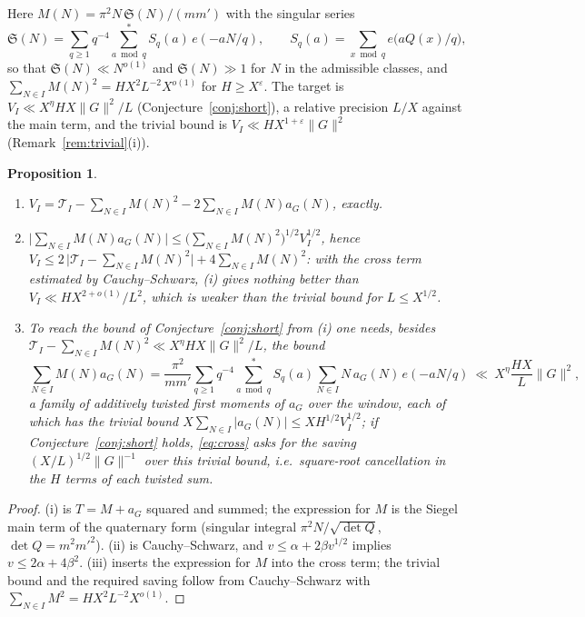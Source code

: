 \documentclass[11pt]{amsart}
\newtheorem{proposition}[theorem]{Proposition}
\theoremstyle{remark}
\newcommand{\e}{\varepsilon}
\begin{document}
Here $M(N)=\pi^2N\,\mathfrak S(N)/(mm')$ with the singular series
\[
\mathfrak S(N)=\sum_{q\ge1}q^{-4}\sum_{a\bmod q}^*S_q(a)\,e(-aN/q),\qquad S_q(a)=\sum_{x\bmod q}e\bigl(aQ(x)/q\bigr),
\]
so that $\mathfrak S(N)\ll N^{o(1)}$ and $\mathfrak S(N)\gg1$ for $N$ in the admissible classes, and $\sum_{N\in I}M(N)^2=HX^2L^{-2}X^{o(1)}$ for $H\ge X^\e$. The target is $V_I\ll X^\eta HX\|G\|^2/L$ (Conjecture~\ref{conj:short}), a relative precision $L/X$ against the main term, and the trivial bound is $V_I\ll HX^{1+\e}\|G\|^2$ (Remark~\ref{rem:trivial}(i)).

\begin{proposition}\label{prop:lattice}
\begin{enumerate}[label=\textup{(\roman*)},leftmargin=2.2em]
\item $V_I=\mathcal T_I-\sum_{N\in I}M(N)^2-2\sum_{N\in I}M(N)a_G(N)$, exactly.
\item $\bigl|\sum_{N\in I}M(N)a_G(N)\bigr|\le\bigl(\sum_{N\in I}M(N)^2\bigr)^{1/2}V_I^{1/2}$, hence $V_I\le2\,\bigl|\mathcal T_I-\sum_{N\in I}M(N)^2\bigr|+4\sum_{N\in I}M(N)^2$: with the cross term estimated by Cauchy--Schwarz, (i) gives nothing better than $V_I\ll HX^{2+o(1)}/L^2$, which is weaker than the trivial bound for $L\le X^{1/2}$.
\item To reach the bound of Conjecture~\ref{conj:short} from (i) one needs, besides $\mathcal T_I-\sum_{N\in I}M(N)^2\ll X^\eta HX\|G\|^2/L$, the bound
\begin{equation}\label{eq:cross}
\sum_{N\in I}M(N)a_G(N)=\frac{\pi^2}{mm'}\sum_{q\ge1}q^{-4}\sum_{a\bmod q}^*S_q(a)\sum_{N\in I}N\,a_G(N)\,e(-aN/q)\ \ll\ X^\eta\frac{HX}{L}\|G\|^2,
\end{equation}
a family of additively twisted first moments of $a_G$ over the window, each of which has the trivial bound $X\sum_{N\in I}|a_G(N)|\le XH^{1/2}V_I^{1/2}$; if Conjecture~\ref{conj:short} holds, \eqref{eq:cross} asks for the saving $(X/L)^{1/2}\|G\|^{-1}$ over this trivial bound, i.e.\ square-root cancellation in the $H$ terms of each twisted sum.
\end{enumerate}
\end{proposition}
\begin{proof}
(i) is $T=M+a_G$ squared and summed; the expression for $M$ is the Siegel main term of the quaternary form (singular integral $\pi^2N/\sqrt{\det Q}$, $\det Q=m^2m'^2$). (ii) is Cauchy--Schwarz, and $v\le\alpha+2\beta v^{1/2}$ implies $v\le2\alpha+4\beta^2$. (iii) inserts the expression for $M$ into the cross term; the trivial bound and the required saving follow from Cauchy--Schwarz with $\sum_{N\in I}M^2=HX^2L^{-2}X^{o(1)}$.
\end{proof}
\end{document}
